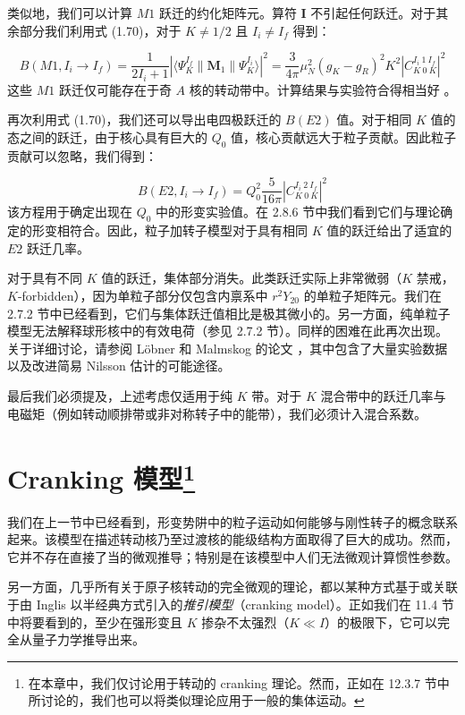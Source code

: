 类似地，我们可以计算 $M1$ 跃迁的约化矩阵元。算符 $\boldsymbol{I}$ 不引起任何跃迁。对于其余部分我们利用式
(1.70)，对于 $K\neq1/2$ 且 $I_{i}\neq I_{f}$ 得到：

\begin{equation}
B(M1,I_{i}\to I_{f})=\frac{1}{2I_{i}+1}|\langle\Psi^{I_{f}}_{K}\|\boldsymbol{M}_{1}\|\Psi^{I_{i}}_{K}\rangle|^{2}=\frac{3}{4\pi}\mu^{2}_{N}(g_{K}-g_{R})^{2}K^{2}|C^{I_{i}\ 1\ I_{f}}_{K\ 0\ K}|^{2}\label{eq:3.64}
\end{equation}
这些 $M1$ 跃迁仅可能存在于奇 $A$ 核的转动带中。计算结果与实验符合得相当好 \cite{SBP67}。

再次利用式 (1.70)，我们还可以导出电四极跃迁的 $B(E2)$ 值。对于相同 $K$ 值的态之间的跃迁，由于核心具有巨大的
$Q_{0}$ 值，核心贡献远大于粒子贡献。因此粒子贡献可以忽略，我们得到：

\begin{equation}
B(E2,I_{i}\to I_{f})=Q^{2}_{0}\frac{5}{16\pi}|C^{I_{i}\ 2\ I_{f}}_{K\ 0\ K}|^{2}\label{eq:3.65}
\end{equation}
该方程用于确定出现在 $Q_{0}$ 中的形变实验值。在 2.8.6 节中我们看到它们与理论确定的形变相符合。因此，粒子加转子模型对于具有相同
$K$ 值的跃迁给出了适宜的 $E2$ 跃迁几率。

对于具有不同 $K$ 值的跃迁，集体部分消失。此类跃迁实际上非常微弱（$K$ 禁戒，$K$-forbidden），因为单粒子部分仅包含内禀系中
$r^{2}Y_{20}$ 的单粒子矩阵元。我们在 2.7.2 节中已经看到，它们与集体跃迁值相比是极其微小的。另一方面，纯单粒子模型无法解释球形核中的有效电荷（参见
2.7.2 节）。同样的困难在此再次出现。关于详细讨论，请参阅 Löbner 和 Malmskog 的论文 \cite{LM66}，其中包含了大量实验数据以及改进简易
Nilsson 估计的可能途径。

最后我们必须提及，上述考虑仅适用于纯 $K$ 带。对于 $K$ 混合带中的跃迁几率与电磁矩（例如转动顺排带或非对称转子中的能带），我们必须计入混合系数。

\section{Cranking 模型\protect\footnote{在本章中，我们仅讨论用于转动的 cranking 理论。然而，正如在 12.3.7 节中所讨论的，我们也可以将类似理论应用于一般的集体运动。}}

我们在上一节中已经看到，形变势阱中的粒子运动如何能够与刚性转子的概念联系起来。该模型在描述转动核乃至过渡核的能级结构方面取得了巨大的成功。然而，它并不存在直接了当的微观推导；特别是在该模型中人们无法微观计算惯性参数。

另一方面，几乎所有关于原子核转动的完全微观的理论，都以某种方式基于或关联于由 Inglis \cite{In54,In56} 以半经典方式引入的\emph{推引模型}（cranking
model）。正如我们在 11.4 节中将要看到的，至少在强形变且 $K$ 掺杂不太强烈（$K\ll I$）的极限下，它可以完全从量子力学推导出来。

